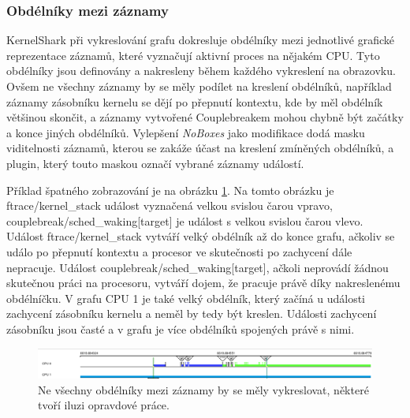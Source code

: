 \subsubsection*{Obdélníky mezi záznamy}
KernelShark při vykreslování grafu dokresluje obdélníky mezi jednotlivé grafické reprezentace záznamů, které vyznačují aktivní proces na nějakém CPU. Tyto obdélníky jsou definovány a nakresleny během každého vykreslení na obrazovku. Ovšem ne všechny záznamy by se měly podílet na kreslení obdélníků, například záznamy zásobníku kernelu se dějí po přepnutí kontextu, kde by měl obdélník většinou skončit, a záznamy vytvořené Couplebreakem mohou chybně být začátky a konce jiných obdélníků. Vylepšení \emph{NoBoxes} jako modifikace dodá masku viditelnosti záznamů, kterou se zakáže účast na kreslení zmíněných obdélníků, a plugin, který touto maskou označí vybrané záznamy událostí.

Příklad špatného zobrazování je na obrázku \ref{obr03:modif-noboxes-bad}. Na tomto obrázku je ftrace/kernel\_stack událost vyznačená velkou svislou čarou vpravo, couplebreak/sched\_waking[target] je událost s velkou svislou čarou vlevo. Událost ftrace/kernel\_stack vytváří velký obdélník až do konce grafu, ačkoliv se událo po přepnutí kontextu a procesor ve skutečnosti po zachycení dále nepracuje. Událost couplebreak/sched\_waking[target], ačkoli neprovádí žádnou skutečnou práci na procesoru, vytváří dojem, že pracuje právě díky nakreslenému obdélníčku. V grafu CPU 1 je také velký obdélník, který začíná u události zachycení zásobníku kernelu a neměl by tedy být kreslen. Události zachycení zásobníku jsou časté a v grafu je více obdélníků spojených právě s nimi.

\begin{figure}[p]\centering
    \includegraphics[width=140mm]{img/Modifikace/modif-noboxes-bad}
    \caption{Ne všechny obdélníky mezi záznamy by se měly vykreslovat, některé tvoří iluzi opravdové práce.}
    \label{obr03:modif-noboxes-bad}
\end{figure}